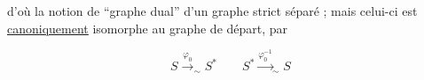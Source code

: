 d'où la notion de ``graphe dual'' d'un graphe
strict séparé ; mais celui-ci est \uline{canoniquement} isomorphe
au graphe de départ, par

\[
 S\xrightarrow{\varphi_0}_{\sim} S^*\qquad S^*\xrightarrow{\varphi_0^{-1}}_{\sim}S \tag*{(22)}
\]

